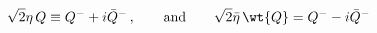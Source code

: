 \begin{equation}
\sqrt{2}\eta\,Q\equiv Q^-+i\bar{Q}^-\,,\qquad\text{and}\qquad
\sqrt{2}\bar{\eta}\,\wt{Q}=Q^--i\bar{Q}^-
\end{equation}


